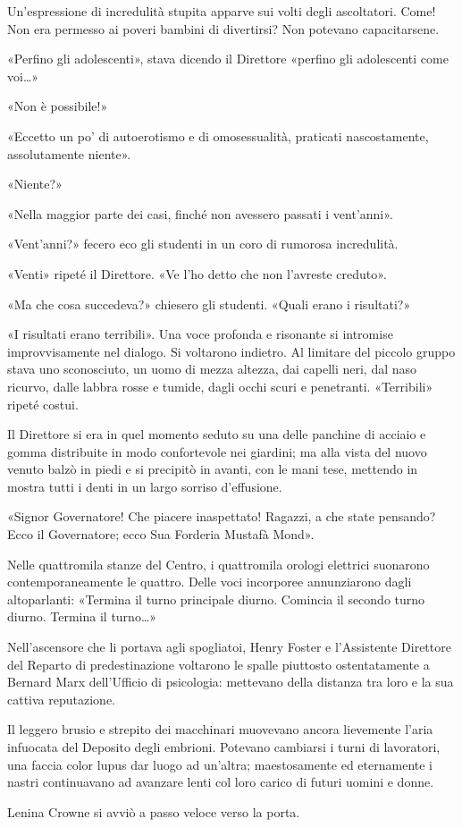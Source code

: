 \documentclass[
a5paper, %
10pt, %
twoside, 
onecolumn, %
openany, %
]{memoir}
\renewenvironment{shaded}{%
  \def\FrameCommand{\fboxsep=\FrameSep \colorbox{shadecolor}}%
  \MakeFramed{\advance\hsize-\width \FrameRestore\FrameRestore}}%
 {\endMakeFramed}
\begin{document}
Un’espressione di incredulità stupita apparve sui volti degli ascoltatori. Come! Non era permesso ai poveri bambini di divertirsi? Non potevano capacitarsene.

«Perfino gli adolescenti», stava dicendo il Direttore «perfino gli adolescenti come voi…»

«Non è possibile!»

«Eccetto un po’ di autoerotismo e di omosessualità, praticati nascostamente, assolutamente niente».

«Niente?»

«Nella maggior parte dei casi, finché non avessero passati i vent’anni».

«Vent’anni?» fecero eco gli studenti in un coro di rumorosa incredulità.

«Venti» ripeté il Direttore. «Ve l’ho detto che non l’avreste creduto».

«Ma che cosa succedeva?» chiesero gli studenti. «Quali erano i risultati?»

«I risultati erano terribili». Una voce profonda e risonante si intromise improvvisamente nel dialogo. Si voltarono indietro. Al limitare del piccolo gruppo stava uno sconosciuto, un uomo di mezza altezza, dai capelli neri, dal naso ricurvo, dalle labbra rosse e tumide, dagli occhi scuri e penetranti. «Terribili» ripeté costui.

Il Direttore si era in quel momento seduto su una delle panchine di acciaio e gomma distribuite in modo confortevole nei giardini; ma alla vista del nuovo venuto balzò in piedi e si precipitò in avanti, con le mani tese, mettendo in mostra tutti i denti in un largo sorriso d’effusione.

«Signor Governatore! Che piacere inaspettato! Ragazzi, a che state pensando? Ecco il Governatore; ecco Sua Forderia Mustafà Mond».

\begin{shaded}
    Nelle quattromila stanze del Centro, i quattromila orologi elettrici suonarono contemporaneamente le quattro. Delle voci incorporee annunziarono dagli altoparlanti: «Termina il turno principale diurno. Comincia il secondo turno diurno. Termina il turno…»

Nell’ascensore che li portava agli spogliatoi, Henry Foster e l’Assistente Direttore del Reparto di predestinazione voltarono le spalle piuttosto ostentatamente a Bernard Marx dell’Ufficio di psicologia: mettevano della distanza tra loro e la sua cattiva reputazione.

Il leggero brusio e strepito dei macchinari muovevano ancora lievemente l’aria infuocata del Deposito degli embrioni. Potevano cambiarsi i turni di lavoratori, una faccia color lupus dar luogo ad un’altra; maestosamente ed eternamente i nastri continuavano ad avanzare lenti col loro carico di futuri uomini e donne.

Lenina Crowne si avviò a passo veloce verso la porta.
\end{shaded}
\end{document}
